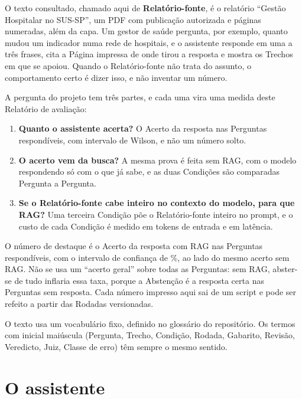 \documentclass[11pt,a4paper]{article}
\begin{document}
O texto consultado, chamado aqui de \textbf{Relatório-fonte}, é o
relatório ``Gestão Hospitalar no SUS-SP'', um PDF com publicação autorizada e
\NumCorpusPaginas{} páginas numeradas, além da capa. Um gestor de saúde
pergunta, por exemplo, quanto mudou um indicador numa rede de hospitais, e o
assistente responde em uma a três frases, cita a Página impressa de onde
tirou a resposta e mostra os Trechos em que se apoiou. Quando o
Relatório-fonte não trata do assunto, o comportamento certo é dizer isso, e
não inventar um número.

A pergunta do projeto tem três partes, e cada uma vira uma medida deste
Relatório de avaliação:

\begin{enumerate}[leftmargin=*, itemsep=2pt]
  \item \textbf{Quanto o assistente acerta?} O Acerto da resposta nas
    Perguntas respondíveis, com intervalo de Wilson, e não um número solto.
  \item \textbf{O acerto vem da busca?} A mesma prova é feita sem RAG, com o
    modelo respondendo só com o que já sabe, e as duas Condições são
    comparadas Pergunta a Pergunta.
  \item \textbf{Se o Relatório-fonte cabe inteiro no contexto do modelo, para que
    RAG?} Uma terceira Condição põe o Relatório-fonte inteiro no prompt, e o
    custo de cada Condição é medido em tokens de entrada e em latência.
\end{enumerate}

\begin{destaque}
  O número de destaque é o Acerto da resposta com RAG nas
  \NumDestaqueNRespondiveis{} Perguntas respondíveis, com o intervalo de
  confiança de \NumIcNivel\%, ao lado do mesmo acerto sem RAG. Não se usa um
  ``acerto geral'' sobre todas as \NumGabaritoNPerguntas{} Perguntas: sem
  RAG, abster-se de tudo inflaria essa taxa, porque a Abstenção é a resposta
  certa nas Perguntas sem resposta. Cada número impresso aqui sai de um
  script e pode ser refeito a partir das Rodadas versionadas.
\end{destaque}

O texto usa um vocabulário fixo, definido no glossário do repositório. Os
termos com inicial maiúscula (Pergunta, Trecho, Condição, Rodada, Gabarito,
Revisão, Veredicto, Juiz, Classe de erro) têm sempre o mesmo sentido.

\section{O assistente}
\end{document}
